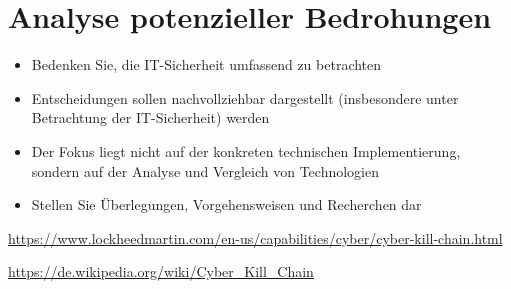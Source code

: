 \section{Analyse potenzieller Bedrohungen}

\begin{itemize}
    \item Bedenken Sie, die IT-Sicherheit umfassend zu betrachten
    \item  Entscheidungen sollen nachvollziehbar dargestellt (insbesondere unter Betrachtung der IT-Sicherheit) werden
    \item Der Fokus liegt nicht auf der konkreten technischen Implementierung, sondern auf der Analyse
    und Vergleich von Technologien
    \item Stellen Sie Überlegungen, Vorgehensweisen und Recherchen dar
\end{itemize}

\url{https://www.lockheedmartin.com/en-us/capabilities/cyber/cyber-kill-chain.html}

\url{https://de.wikipedia.org/wiki/Cyber_Kill_Chain}